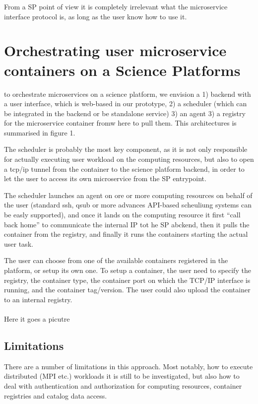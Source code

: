 \documentclass[11pt,twoside]{article}
\begin{document}
From a SP point of view it is completely irrelevant what the microservice interface protocol is, as long as the user know how to use it. 



\section{Orchestrating user microservice containers on a Science Platforms}
to orchestrate microservices on a science platform, we envision a 1) backend with a user interface, which is web-based in our prototype, 2) a scheduler (which can be integrated in the backend or be standalone service) 3) an agent 3) a registry for the microservice container fromw here to pull them. This architectures is summarised in figure 1.

The scheduler is probably the most key component, as it is not only responsible for actually executing user workload on the computing resources, but also to open a tcp/ip tunnel from the container to the science platform backend, in order to let the user to access its own microservice from the SP entrypoint.

The scheduler launches an agent on ore or more computing resources on behalf of the user (standard ssh, qsub or more advances API-based scheuliung systems can be easly supported), and once it lands on the computing resource it first “call back home”  to communicate the internal IP tot he SP abckend, then it pulls the container from the registry, and finally it runs the containers starting the actual user task.

The user can choose from one of the available containers registered in the platform, or setup its own one. To setup a container, the user need to specify the registry, the container type, the container port on which the TCP/IP interface is running, and the container tag/version. The user could also upload the container to an internal registry.
\\
\\
Here it goes a picutre



\subsection{Limitations}
There are a number of limitations in this approach. Most notably, how to execute distributed (MPI etc.)  workloads it is still to be investigated, but also how to deal with authentication and authorization for computing resources, container registries and catalog data access.
\end{document}
